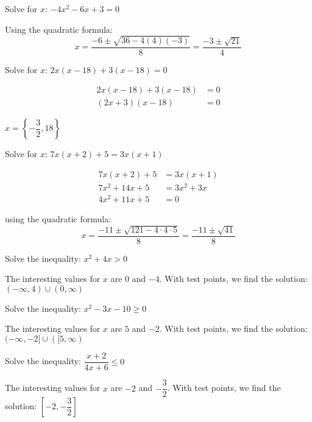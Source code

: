 \documentclass[fleqn,addpoints]{exam}
\begin{document}
\begin{questions}
\question 
Solve for $x$: $-4x^2-6x+3 = 0$
\begin{solution}

Using the quadratic formula:
\[
  x = \frac{-6 \pm \sqrt{36 - 4 (4) (-3)}}{8} = \frac{-3 \pm \sqrt{21}}{4}
\]

\end{solution}

\pagebreak

\question 
Solve for $x$: $2x(x-18) + 3(x-18) = 0$
\begin{solution}
\begin{align*}
  2x(x-18) + 3(x-18) &= 0 \\
  (2x+3)(x-18) &= 0
\end{align*}

$x = \left\{ -\dfrac{3}{2}, 18 \right\}$

\end{solution}

\question 
Solve for $x$: $7x(x+2) + 5 = 3x(x+1)$
\begin{solution}

\begin{align*}
  7x(x+2) + 5 &= 3x(x+1) \\
  7x^2 + 14x + 5 &= 3x^2 + 3x \\
  4x^2 + 11x + 5 &= 0 
\end{align*}

using the quadratic formula:
\[
  x = \frac{-11 \pm \sqrt{121 - 4 \cdot 4 \cdot 5}}{8} = \frac{-11 \pm \sqrt{41}}{8}
\]

\end{solution}

\question 
Solve the inequality: $x^2+4x > 0$
\begin{solution}
The interesting values for $x$ are $0$ and $-4$.  With test points, we find the solution: $(-\infty, 4) \cup (0, \infty)$
\end{solution}

\question 
Solve the inequality: $x^2-3x-10 \geq 0$
\begin{solution}
The interesting values for $x$ are $5$ and $-2$.  With test points, we find the solution: $(-\infty, -2] \cup ([5, \infty)$
\end{solution}

\question 
Solve the inequality: $\dfrac{x+2}{4x+6} \leq 0$
\begin{solution}
The interesting values for $x$ are $-2$ and $-\dfrac{3}{2}$.  With test points, we find the solution: $\left[ -2, -\dfrac{3}{2} \right]$
\end{solution}


\end{questions}
\end{document}
